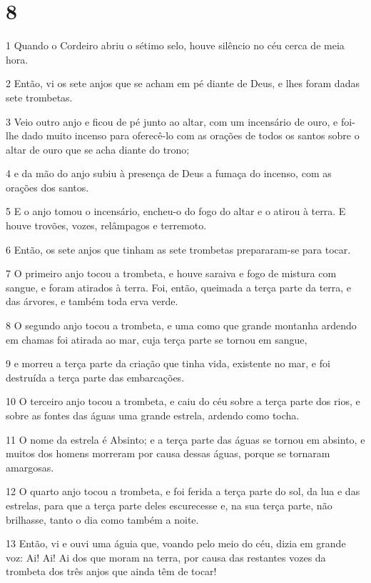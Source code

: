 \chapter{8}

\par 1 Quando o Cordeiro abriu o sétimo selo, houve silêncio no céu cerca de meia hora.
\par 2 Então, vi os sete anjos que se acham em pé diante de Deus, e lhes foram dadas sete trombetas.
\par 3 Veio outro anjo e ficou de pé junto ao altar, com um incensário de ouro, e foi-lhe dado muito incenso para oferecê-lo com as orações de todos os santos sobre o altar de ouro que se acha diante do trono;
\par 4 e da mão do anjo subiu à presença de Deus a fumaça do incenso, com as orações dos santos.
\par 5 E o anjo tomou o incensário, encheu-o do fogo do altar e o atirou à terra. E houve trovões, vozes, relâmpagos e terremoto.
\par 6 Então, os sete anjos que tinham as sete trombetas prepararam-se para tocar.
\par 7 O primeiro anjo tocou a trombeta, e houve saraiva e fogo de mistura com sangue, e foram atirados à terra. Foi, então, queimada a terça parte da terra, e das árvores, e também toda erva verde.
\par 8 O segundo anjo tocou a trombeta, e uma como que grande montanha ardendo em chamas foi atirada ao mar, cuja terça parte se tornou em sangue,
\par 9 e morreu a terça parte da criação que tinha vida, existente no mar, e foi destruída a terça parte das embarcações.
\par 10 O terceiro anjo tocou a trombeta, e caiu do céu sobre a terça parte dos rios, e sobre as fontes das águas uma grande estrela, ardendo como tocha.
\par 11 O nome da estrela é Absinto; e a terça parte das águas se tornou em absinto, e muitos dos homens morreram por causa dessas águas, porque se tornaram amargosas.
\par 12 O quarto anjo tocou a trombeta, e foi ferida a terça parte do sol, da lua e das estrelas, para que a terça parte deles escurecesse e, na sua terça parte, não brilhasse, tanto o dia como também a noite.
\par 13 Então, vi e ouvi uma águia que, voando pelo meio do céu, dizia em grande voz: Ai! Ai! Ai dos que moram na terra, por causa das restantes vozes da trombeta dos três anjos que ainda têm de tocar!

